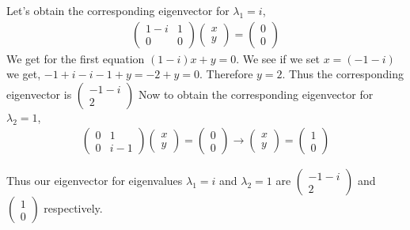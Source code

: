 \documentclass[12pt]{article}
\begin{document}
    Let's obtain the corresponding eigenvector for $\lambda_1 = i$,
    \begin{align*}
        \begin{pmatrix}
            1-i & 1 \\
            0 & 0
            \end{pmatrix} \begin{pmatrix}
                x \\ y 
            \end{pmatrix} = \begin{pmatrix}
                0 \\ 0
            \end{pmatrix} 
    \end{align*} 
    We get for the first equation $(1-i)x + y = 0$. We see if we set $x = (-1 - i)$ we get, $-1 + i -i -1 + y = -2 + y = 0$. Therefore $y = 2$. Thus the corresponding eigenvector is $\begin{pmatrix}
        -1 -i \\ 2
    \end{pmatrix}$
    \newcommand {\la} {{\lambda}}
    Now to obtain the corresponding eigenvector for $\lambda_2 = 1$,
    \begin{align*}
        \begin{pmatrix}
            0 & 1 \\
            0 & i-1
        \end{pmatrix} \begin{pmatrix}
                x \\ y 
        \end{pmatrix} = \begin{pmatrix}
                0 \\ 0
        \end{pmatrix} \rightarrow \begin{pmatrix}
            x \\ y
        \end{pmatrix} = \begin{pmatrix}
            1 \\ 0
        \end{pmatrix}
    \end{align*}

    Thus our eigenvector for eigenvalues $\lambda_1 = i$ and $\lambda_2 = 1$ are $\begin{pmatrix}
        -1 -i \\ 2
    \end{pmatrix}$ and $\begin{pmatrix}
        1 \\ 0
    \end{pmatrix}$ respectively.
\end{document}
